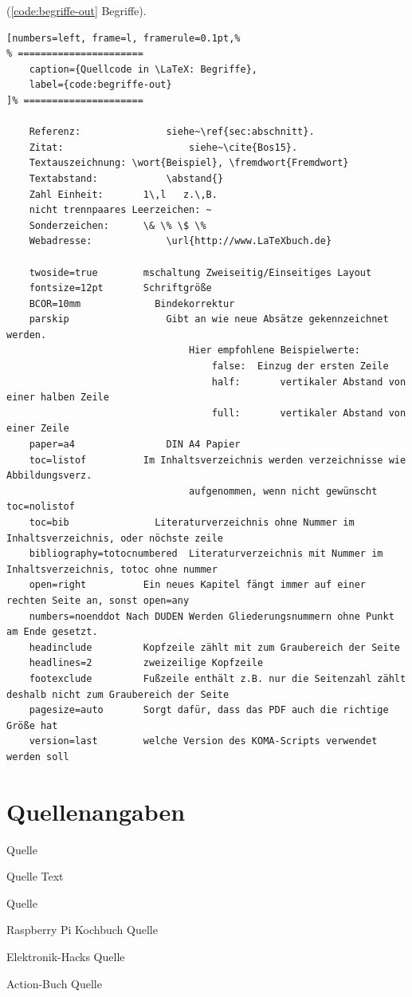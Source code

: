 (\autoref{code:begriffe-out} Begriffe).
\lstset{language=[LaTeX]TeX} %
\begin{lstlisting}[numbers=left, frame=l, framerule=0.1pt,%
% ======================
	caption={Quellcode in \LaTeX: Begriffe},
	label={code:begriffe-out}
]% =====================

	Referenz: 				siehe~\ref{sec:abschnitt}.
	Zitat: 						siehe~\cite{Bos15}.
	Textauszeichnung: \wort{Beispiel}, \fremdwort{Fremdwort}
	Textabstand: 			\abstand{}
	Zahl Einheit: 		1\,l   z.\,B.
	nicht trennpaares Leerzeichen: ~
	Sonderzeichen: 		\& \% \$ \%
	Webadresse:				\url{http://www.LaTeXbuch.de}

	twoside=true		mschaltung Zweiseitig/Einseitiges Layout
	fontsize=12pt		Schriftgröße
	BCOR=10mm			  Bindekorrektur
	parskip					Gibt an wie neue Absätze gekennzeichnet werden.
								Hier empfohlene Beispielwerte:
									false:	Einzug der ersten Zeile
									half:		vertikaler Abstand von einer halben Zeile
									full:		vertikaler Abstand von einer Zeile
	paper=a4				DIN A4 Papier
	toc=listof			Im Inhaltsverzeichnis werden verzeichnisse wie Abbildungsverz.
								aufgenommen, wenn nicht gewünscht toc=nolistof
	toc=bib				  Literaturverzeichnis ohne Nummer im Inhaltsverzeichnis, oder nöchste zeile
	bibliography=totocnumbered	Literaturverzeichnis mit Nummer im Inhaltsverzeichnis, totoc ohne nummer
	open=right			Ein neues Kapitel fängt immer auf einer rechten Seite an, sonst open=any
	numbers=noenddot Nach DUDEN Werden Gliederungsnummern ohne Punkt am Ende gesetzt.
	headinclude			Kopfzeile zählt mit zum Graubereich der Seite
	headlines=2			zweizeilige Kopfzeile
	footexclude			Fußzeile enthält z.B. nur die Seitenzahl zählt deshalb nicht zum Graubereich der Seite
	pagesize=auto		Sorgt dafür, dass das PDF auch die richtige Größe hat
	version=last		welche Version des KOMA-Scripts verwendet werden soll
\end{lstlisting}

\newpage %

\section{Quellenangaben}

Quelle \textcite{schlosser_latex:2016}

Quelle Text

Quelle \cite{schlosser_latex:2016}

Raspberry Pi Kochbuch Quelle \cite{monk_raspberry:2014}

Elektronik-Hacks  Quelle \cite{monk_elektronik_hacks:2013}

Action-Buch Quelle  \cite{monk_action_buch:2016}
